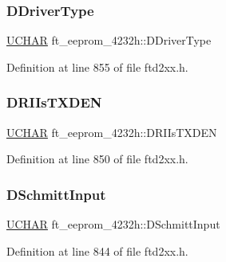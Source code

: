 \subsubsection{\texorpdfstring{D\+Driver\+Type}{DDriverType}}
{\footnotesize\ttfamily \hyperlink{CatCaloProto40MHz_2inc_2WinTypes_8h_a4f4bb67531a9bf6f0b9c6ad76aeba587}{U\+C\+H\+AR} ft\+\_\+eeprom\+\_\+4232h\+::\+D\+Driver\+Type}



Definition at line 855 of file ftd2xx.\+h.

\mbox{\label{structft__eeprom__4232h_aff58f44eb2769cd3d614cdd03357a56c}} 
\subsubsection{\texorpdfstring{D\+R\+I\+Is\+T\+X\+D\+EN}{DRIIsTXDEN}}
{\footnotesize\ttfamily \hyperlink{CatCaloProto40MHz_2inc_2WinTypes_8h_a4f4bb67531a9bf6f0b9c6ad76aeba587}{U\+C\+H\+AR} ft\+\_\+eeprom\+\_\+4232h\+::\+D\+R\+I\+Is\+T\+X\+D\+EN}



Definition at line 850 of file ftd2xx.\+h.

\mbox{\label{structft__eeprom__4232h_aba9def054b418e85177c70cae98cb17e}} 
\subsubsection{\texorpdfstring{D\+Schmitt\+Input}{DSchmittInput}}
{\footnotesize\ttfamily \hyperlink{CatCaloProto40MHz_2inc_2WinTypes_8h_a4f4bb67531a9bf6f0b9c6ad76aeba587}{U\+C\+H\+AR} ft\+\_\+eeprom\+\_\+4232h\+::\+D\+Schmitt\+Input}



Definition at line 844 of file ftd2xx.\+h.

\mbox{\label{structft__eeprom__4232h_ae32b979b9db358e8b6613e41ed201110}} 
